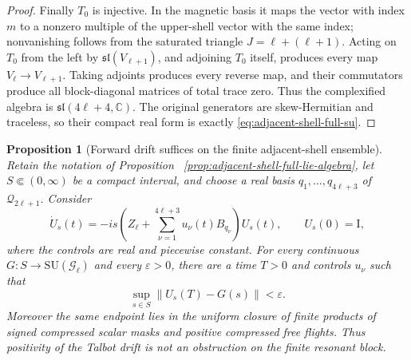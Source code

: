 \documentclass[11pt]{article}
\newtheorem{proposition}[theorem]{Proposition}
\theoremstyle{remark}
\newcommand{\Id}{\mathrm I}
\begin{document}
\begin{proof}
Finally $T_0$ is injective.  In the magnetic basis it maps the vector with
index $m$ to a nonzero multiple of the upper-shell vector with the same
index; nonvanishing follows from the saturated triangle
$J=\ell+(\ell+1)$.  Acting on $T_0$ from the left by
$\mathfrak{sl}(V_{\ell+1})$, and adjoining $T_0$ itself, produces every map
$V_\ell\to V_{\ell+1}$.  Taking adjoints produces every reverse map, and
their commutators produce all block-diagonal matrices of total trace zero.
Thus the complexified algebra is
$\mathfrak{sl}(4\ell+4,\mathbb C)$.  The original generators are
skew-Hermitian and traceless, so their compact real form is exactly
\eqref{eq:adjacent-shell-full-su}.
\end{proof}

\begin{proposition}[Forward drift suffices on the finite adjacent-shell ensemble]
\label{prop:finite-adjacent-shell-ensemble-gate}
Retain the notation of Proposition
~\ref{prop:adjacent-shell-full-lie-algebra}, let
$S\Subset(0,\infty)$ be a compact interval, and choose a real basis
$q_1,\ldots,q_{4\ell+3}$ of $\mathcal Q_{2\ell+1}$.  Consider
\begin{equation}
 \dot U_s(t)=
 -is\left(
  Z_\ell+\sum_{\nu=1}^{4\ell+3}u_\nu(t)B_{q_\nu}
 \right)U_s(t),
 \qquad U_s(0)=\Id ,
 \label{eq:finite-adjacent-shell-ensemble}
\end{equation}
where the controls are real and piecewise constant.  For every continuous
$G:S\to\mathrm{SU}(\mathcal G_\ell)$ and every $\varepsilon>0$, there are a time
$T>0$ and controls $u_\nu$ such that
\begin{equation}
 \sup_{s\in S}\|U_s(T)-G(s)\|<\varepsilon.
 \label{eq:finite-adjacent-shell-uniform-gate}
\end{equation}
Moreover the same endpoint lies in the uniform closure of finite products
of signed compressed scalar masks and positive compressed free flights.
Thus positivity of the Talbot drift is not an obstruction on the finite
resonant block.
\end{proposition}
\end{document}
